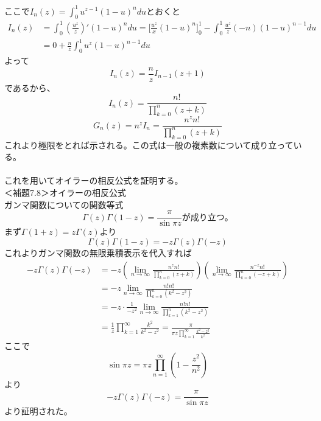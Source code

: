 \documentclass{jsarticle}
\begin{document}
ここで\(\displaystyle I_{n}(z)=\int_{0}^{1}u^{z-1}(1-u)^{n}du\)とおくと
\begin{align*}
I_{n}(z)&=\int_{0}^{1}\left(\frac{u^{z}}{z}\right)'(1-u)^{n}du=\Biggl[\frac{u^{z}}{x}(1-u)^{n}\Biggr]_{0}^{1}-\int_{0}^{1}\frac{u^{z}}{z}(-n)(1-u)^{n-1}du\\
&=0+\frac{n}{z}\int_{0}^{1}u^{z}(1-u)^{n-1}du
\end{align*}
よって
\[I_{n}(z)=\frac{n}{z}I_{n-1}(z+1)\]
であるから、
\[I_{n}(z)=\frac{n!}{\prod_{k=0}^{n}(z+k)}\]
\[G_{n}(z)=n^{z}I_{n}=\frac{n^{z}n!}{\prod_{k=0}^{n}(z+k)}\]
これより極限をとれば示される。この式は一般の複素数について成り立っている。\\
\\
これを用いてオイラーの相反公式を証明する。\\
＜補題7.8＞オイラーの相反公式\\
ガンマ関数についての関数等式
\begin{equation}
\Gamma(z)\Gamma(1-z)=\frac{\pi}{\sin\pi z}
が成り立つ。
\end{equation}
まず\(\Gamma(1+z)=z\Gamma(z)\)より
\[\Gamma(z)\Gamma(1-z)=-z\Gamma(z)\Gamma(-z)\]
これよりガンマ関数の無限乗積表示を代入すれば
\begin{align*}
-z\Gamma(z)\Gamma(-z)&=-z\left(\lim_{n\to\infty}\frac{n^{z}n!}{\prod_{k=0}^{n}(z+k)}\right)\left(\lim_{n\to\infty}\frac{n^{-z}n!}{\prod_{k=0}^{n}(-z+k)}\right)\\
&=-z\lim_{n\to\infty}\frac{n!n!}{\prod_{k=0}^{n}(k^{2}-z^{2})}\\
&=-z\cdot\frac{1}{-z^2}\lim_{n\to\infty}\frac{n!n!}{\prod_{k=1}^{n}(k^{2}-z^{2})}\\
&=\frac{1}{z}\prod_{k=1}^{\infty}\frac{k^2}{k^{2}-z^{2}}=\frac{\pi}{\pi z\prod_{k=1}^{\infty}\frac{k^{2}-z^{2}}{k^{2}}}
\end{align*}
ここで
\[\sin\pi z=\pi z\prod_{n=1}^{\infty}\left(1-\frac{z^2}{n^{2}}\right)\]
より
\[-z\Gamma(z)\Gamma(-z)=\frac{\pi}{\sin\pi z}\]
より証明された。







\setcounter{equation}{0}
\end{document}
